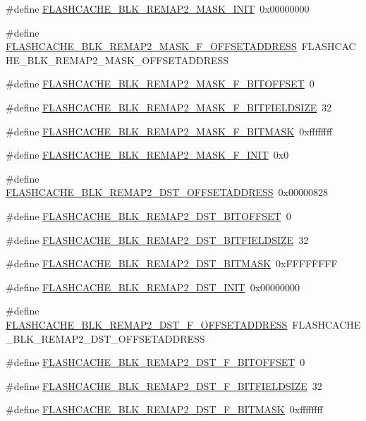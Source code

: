 \begin{DoxyCompactItemize}
\item 
\#define \hyperlink{a00550_a59ae3e33c9be60ccd5036c22dee732d0}{FLASHCACHE\_\-BLK\_\-REMAP2\_\-MASK\_\-INIT}~0x00000000
\item 
\#define \hyperlink{a00550_a80066894f8023b4f5901bd1c5578a20b}{FLASHCACHE\_\-BLK\_\-REMAP2\_\-MASK\_\-F\_\-OFFSETADDRESS}~FLASHCACHE\_\-BLK\_\-REMAP2\_\-MASK\_\-OFFSETADDRESS
\item 
\#define \hyperlink{a00550_a3a11a4f17b93abac8c164ed956133cbe}{FLASHCACHE\_\-BLK\_\-REMAP2\_\-MASK\_\-F\_\-BITOFFSET}~0
\item 
\#define \hyperlink{a00550_a6d05e8d9b7a9248db345aed311fa23bd}{FLASHCACHE\_\-BLK\_\-REMAP2\_\-MASK\_\-F\_\-BITFIELDSIZE}~32
\item 
\#define \hyperlink{a00550_a39c3dbd0c65246eef4d834e8a22e425f}{FLASHCACHE\_\-BLK\_\-REMAP2\_\-MASK\_\-F\_\-BITMASK}~0xffffffff
\item 
\#define \hyperlink{a00550_ae6739a62ef304070bc1e098f10f64795}{FLASHCACHE\_\-BLK\_\-REMAP2\_\-MASK\_\-F\_\-INIT}~0x0
\item 
\#define \hyperlink{a00550_a720e58cad0a3aeef3c719324ebeae65c}{FLASHCACHE\_\-BLK\_\-REMAP2\_\-DST\_\-OFFSETADDRESS}~0x00000828
\item 
\#define \hyperlink{a00550_a3ae11eb52304ce635e60af75d9c1c657}{FLASHCACHE\_\-BLK\_\-REMAP2\_\-DST\_\-BITOFFSET}~0
\item 
\#define \hyperlink{a00550_a98ed7da516b9bf92da6a2f4960c5cb46}{FLASHCACHE\_\-BLK\_\-REMAP2\_\-DST\_\-BITFIELDSIZE}~32
\item 
\#define \hyperlink{a00550_a81bacd4be349ef631143721f56b71478}{FLASHCACHE\_\-BLK\_\-REMAP2\_\-DST\_\-BITMASK}~0xFFFFFFFF
\item 
\#define \hyperlink{a00550_ab6587f7c4e79eaefcac43cea75275509}{FLASHCACHE\_\-BLK\_\-REMAP2\_\-DST\_\-INIT}~0x00000000
\item 
\#define \hyperlink{a00550_a34a04e7357c7115d40a7697e1e00057f}{FLASHCACHE\_\-BLK\_\-REMAP2\_\-DST\_\-F\_\-OFFSETADDRESS}~FLASHCACHE\_\-BLK\_\-REMAP2\_\-DST\_\-OFFSETADDRESS
\item 
\#define \hyperlink{a00550_acfde08fa8240712e7d2955ec9f3d664f}{FLASHCACHE\_\-BLK\_\-REMAP2\_\-DST\_\-F\_\-BITOFFSET}~0
\item 
\#define \hyperlink{a00550_af9758893e8a13ebd71cc877ff57113ae}{FLASHCACHE\_\-BLK\_\-REMAP2\_\-DST\_\-F\_\-BITFIELDSIZE}~32
\item 
\#define \hyperlink{a00550_ab96dd586cc674f851fa99447ebc6523e}{FLASHCACHE\_\-BLK\_\-REMAP2\_\-DST\_\-F\_\-BITMASK}~0xffffffff

\end{DoxyCompactItemize}
